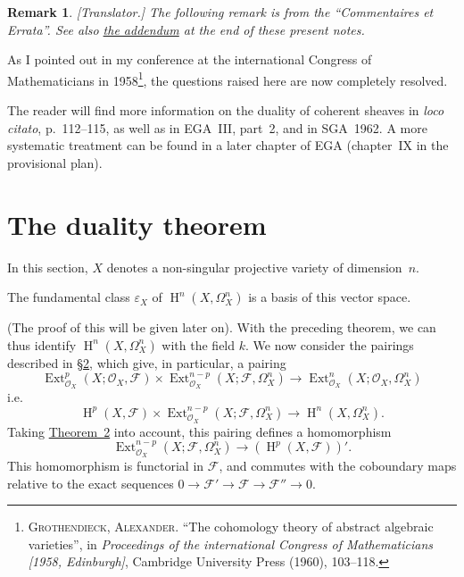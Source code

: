 \documentclass{article}
\theoremstyle{plain}
\newenvironment{theorem}[1]
  {\renewcommand\theinnertheorem{#1}\innertheorem}
  {\endinnertheorem}
\theoremstyle{definition}
\newtheorem*{remark}{Remark}
\newcommand{\scr}[1]{{\mathscr{#1}}}
\DeclareMathOperator{\Ext}{Ext}
\DeclareMathOperator{\HH}{H}
\newcommand{\oldpage}[1]{\marginpar{\footnotesize$\Big\vert$ \textit{p.~#1}}}
\begin{document}
\begin{remark}
  \emph{[Translator.] The following remark is from the ``Commentaires et Errata''. See also \hyperref[addendum]{the addendum} at the end of these present notes.}

  As I pointed out in my conference at the international Congress of Mathematicians in 1958\footnote{\textsc{Grothendieck, Alexander.} ``The cohomology theory of abstract algebraic varieties'', in \emph{Proceedings of the international Congress of Mathematicians [1958, Edinburgh]}, Cambridge University Press (1960), 103--118.}, the questions raised here are now completely resolved.

  The reader will find more information on the duality of coherent sheaves in \emph{loco citato}, p.~112--115, as well as in EGA~III, part~2, and in SGA~1962.
  A more systematic treatment can be found in a later chapter of EGA (chapter~IX in the provisional plan).
\end{remark}


\section{The duality theorem}
\label{section5}

In this section, $X$ denotes a non-singular projective variety of dimension~$n$.

\begin{theorem}{2}
\label{theorem2}
  The fundamental class $\varepsilon_X$ of $\HH^n(X,\Omega_X^n)$ is a basis of this vector space.
\end{theorem}

(The proof of this will be given later on).
With the preceding theorem, we can thus identify $\HH^n(X,\Omega_X^n)$ with the field $k$.
We now consider the pairings described in \hyperref[section2]{\S2}, which give, in particular, a pairing
\oldpage{149-14}
\[
  \Ext_{\scr{O}_X}^p(X;\scr{O}_X,\scr{F})\times\Ext_{\scr{O}_X}^{n-p}(X;\scr{F},\Omega_X^n) \to \Ext_{\scr{O}_X}^n(X;\scr{O}_X,\Omega_X^n)
\]
i.e.
\[
\label{5.1}
  \HH^p(X,\scr{F})\times\Ext_{\scr{O}_X}^{n-p}(X;\scr{F},\Omega_X^n) \to \HH^n(X,\Omega_X^n).
\tag{5.1}
\]
Taking \hyperref[theorem2]{Theorem~2} into account, this pairing defines a homomorphism
\[
\label{5.2}
  \Ext_{\scr{O}_X}^{n-p}(X;\scr{F},\Omega_X^n) \to (\HH^p(X,\scr{F}))'.
\tag{5.2}
\]
This homomorphism is functorial in $\scr{F}$, and commutes with the coboundary maps relative to the exact sequences $0\to\scr{F}'\to\scr{F}\to\scr{F}''\to0$.
\end{document}
